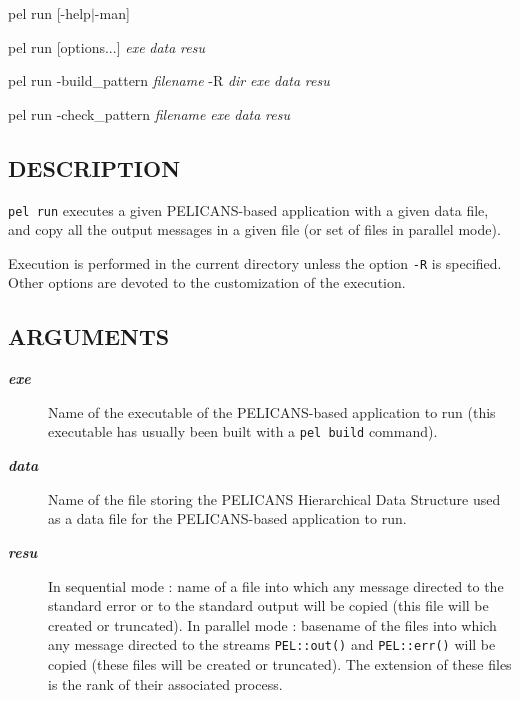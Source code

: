 \documentclass{article}
\begin{document}
pel run [-help$|$-man]



pel run [options...] \emph{exe} \emph{data} \emph{resu}



pel run -build\_pattern \emph{filename} -R \emph{dir} \emph{exe} \emph{data} \emph{resu}



pel run -check\_pattern \emph{filename} \emph{exe} \emph{data} \emph{resu}

\subsection*{DESCRIPTION\label{run_DESCRIPTION}}


\texttt{pel run} executes a given PELICANS-based application with a
given data file, and copy all the output messages in a given file
(or set of files in parallel mode).



Execution is performed in the current directory unless the option
\texttt{-R} is specified. Other options are devoted to the customization
of the execution.

\subsection*{ARGUMENTS\label{run_ARGUMENTS}}
\begin{description}

\item[\textbf{ \emph{exe} }] \mbox{}

Name of the executable of the PELICANS-based application to run
(this executable has usually been built with a \texttt{pel build}
command).


\item[\textbf{ \emph{data} }] \mbox{}

Name of the file storing the PELICANS Hierarchical Data Structure
used as a data file for the PELICANS-based application to run.


\item[\textbf{ \emph{resu} }] \mbox{}

In sequential mode :
name of a file into which any message directed to the standard
error or to the standard output will be copied (this file will
be created or truncated).
In parallel mode : basename of the files into which any message
directed to the streams \texttt{PEL::out()} and \texttt{PEL::err()} will
be copied (these files will be created or truncated). The extension
of these files is the rank of their associated process.

\end{description}
\end{document}
